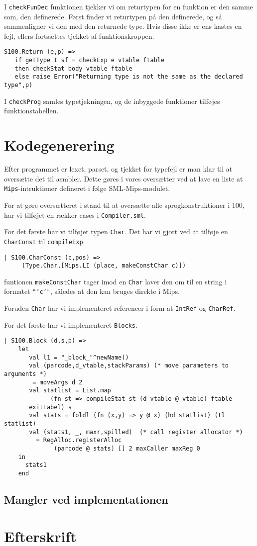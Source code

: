 \documentclass[12pt]{article}
\begin{document}
I \texttt{checkFunDec} funktionen tjekker vi om returtypen for en funktion er
den samme som, den definerede. Først finder vi returtypen på den definerede, og
så sammenligner vi den med den returnede type. Hvis disse ikke er ens kastes en
fejl, ellers fortsættes tjekket af funktionskroppen.

\begin{verbatim}
S100.Return (e,p) => 
   if getType t sf = checkExp e vtable ftable
   then checkStat body vtable ftable
   else raise Error("Returning type is not the same as the declared type",p)
\end{verbatim}

I \texttt{checkProg} samles typetjekningen, og de inbyggede funktioner tilføjes
funktionstabellen.

\section{Kodegenerering}
Efter programmet er lexet, parset, og tjekket for typefejl er man klar til at
oversætte det til asmbler. Dette gøres i vores oversætter ved at lave en liste
at \texttt{Mips}-intruktioner defineret i følge SML-Mips-modulet.

For at gøre oversætteret i stand til at oversætte alle sprogkonstruktioner i
100, har vi tilføjet en rækker cases i \texttt{Compiler.sml}.

For det første har vi tilføjet typen \texttt{Char}. Det har vi gjort ved at
tilføje en \texttt{CharConst} til \texttt{compileExp}.

\begin{verbatim}
| S100.CharConst (c,pos) =>
     (Type.Char,[Mips.LI (place, makeConstChar c)])
\end{verbatim}

funtionen \texttt{makeConstChar} tager imod en \texttt{Char} laver den om til en
string i formatet \texttt{"'c'"}, således at den kan bruges direkte i Mips.

Foruden \texttt{Char} har vi implementeret referencer i form at \texttt{IntRef}
og \texttt{CharRef}.

For det første har vi implementeret \texttt{Blocks}. 

\begin{verbatim}
| S100.Block (d,s,p) => 
    let
       val l1 = "_block_"^newName()
       val (parcode,d_vtable,stackParams) (* move parameters to arguments *)
        = moveArgs d 2
       val statlist = List.map 
             (fn st => compileStat st (d_vtable @ vtable) ftable
       exitLabel) s
       val stats = foldl (fn (x,y) => y @ x) (hd statlist) (tl statlist)
       val (stats1, _, maxr,spilled)  (* call register allocator *)
         = RegAlloc.registerAlloc
              (parcode @ stats) [] 2 maxCaller maxReg 0
    in
      stats1
    end
\end{verbatim}

\subsection{Mangler ved implementationen}

\section{Efterskrift}

{}

\end{document}
